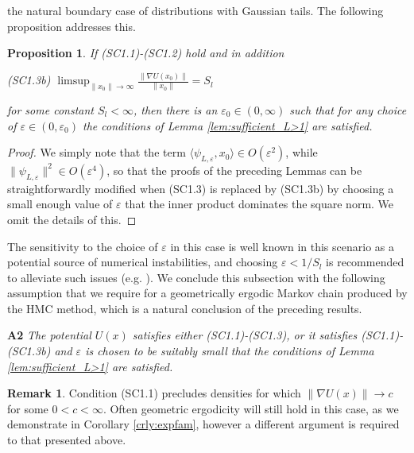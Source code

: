 \documentclass[bj,numbers,noshowframe]{imsart}
\newcommand{\e}{\varepsilon}
\theoremstyle{definition}
\theoremstyle{plain}
\newtheorem{prop}[defn]{Proposition}
\theoremstyle{definition}
\newtheorem{rem}[defn]{Remark}
\begin{document}
the natural boundary case of distributions with Gaussian tails. The following
proposition addresses this.
\begin{prop}
\label{prop:SC1.3b} If  (SC1.1)-(SC1.2) hold and in addition
\vspace{0.3cm}

(SC1.3b) $\limsup_{\|x_{0}\|\to\infty}\frac{\|\nabla U(x_{0})\|}{\|x_{0}\|}=S_{l}$
\vspace{0.3cm}

\noindent for some constant $S_{l}<\infty$, then there is an $\e_{0}\in(0,\infty)$
such that for any choice of $\e\in(0,\e_{0})$ the conditions
of Lemma \ref{lem:sufficient_L>1} are satisfied.
\end{prop}
\begin{proof}
We simply note that the term $\langle\psi_{L,\e},x_{0}\rangle\in O(\e^{2})$,
while $\|\psi_{L,\e}\|^{2}\in O(\e^{4})$, so that the
proofs of the preceding Lemmas can be straightforwardly modified when
(SC1.3) is replaced by (SC1.3b) by choosing a small enough value of
$\e$ that the inner product dominates the square norm. We omit
the details of this.
\end{proof}

The sensitivity to the choice of $\e$ in this case is well known in this scenario as a potential source of numerical instabilities, and choosing $\e < 1/S_l$ is recommended to alleviate such issues (e.g. \citep{leimkuhler2004simulating}).  We conclude this subsection with the following assumption that we require for a geometrically ergodic Markov chain produced by the HMC method, which is a natural conclusion of the preceding results.

\vspace{0.35cm}

\noindent \textbf{A2} {\itshape The potential $U(x)$ satisfies either (SC1.1)-(SC1.3), or it satisfies (SC1.1)-(SC1.3b) and $\e$ is chosen to be suitably small that the conditions of Lemma \ref{lem:sufficient_L>1} are satisfied.} \label{ass:A2}


\begin{rem}
Condition (SC1.1) precludes densities for which $\|\nabla U(x)\| \to c$ for some $0<c<\infty$.  Often geometric ergodicity will still hold in this case, as we demonstrate in Corollary \ref{crly:expfam}, however a different argument is required to that presented above.
\end{rem}
\end{document}
